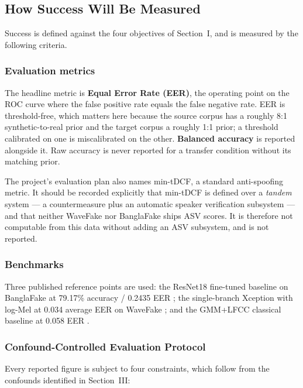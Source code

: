 \documentclass[conference]{IEEEtran}
\renewcommand{\cite}[1]{\unskip}
\begin{document}
\subsection{How Success Will Be Measured}
Success is defined against the four objectives of Section~I, and is measured
by the following criteria.

\subsubsection{Evaluation metrics}
The headline metric is \textbf{Equal Error Rate (EER)}, the operating point on
the ROC curve where the false positive rate equals the false negative rate.
EER is threshold-free, which matters here because the source corpus has a
roughly 8:1 synthetic-to-real prior and the target corpus a roughly 1:1 prior;
a threshold calibrated on one is miscalibrated on the other. \textbf{Balanced
accuracy} is reported alongside it. Raw accuracy is never reported for a
transfer condition without its matching prior.

The project's evaluation plan also names min-tDCF, a standard anti-spoofing
metric. It should be recorded explicitly that min-tDCF is defined over a
\emph{tandem} system --- a countermeasure plus an automatic speaker
verification subsystem --- and that neither WaveFake nor BanglaFake ships ASV
scores. It is therefore not computable from this data without adding an ASV
subsystem, and is not reported.

\subsubsection{Benchmarks}
Three published reference points are used: the ResNet18 fine-tuned baseline on
BanglaFake at 79.17\% accuracy / 0.2435 EER \cite{samu2025zeroshot}; the
single-branch Xception with log-Mel at 0.034 average EER on WaveFake
\cite{ahmed2026melspec}; and the GMM+LFCC classical baseline at 0.058 EER
\cite{frank2021wavefake}.

\subsubsection{Confound-Controlled Evaluation Protocol}
Every reported figure is subject to four constraints, which follow from the
confounds identified in Section~III:
\end{document}
